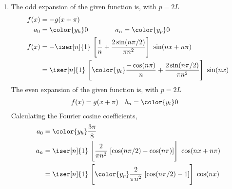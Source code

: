 \begin{enumerate}
    \item The odd expansion of the given function is, with $  p = 2L $
          \begin{align}
              f(x) & = -g(x + \pi)                                                     \\
              a_0  & = {\color{y_h} 0} \qquad\qquad
              a_n = {\color{y_p} 0}                                                    \\
              f(x) & = -\iser[n]{1}\ \Bigg[\frac{1}{n} + \frac{2\sin(n\pi/2)}{\pi n^2}
              \Bigg] \ \sin(nx + n\pi)                                                 \\
                   & = \iser[n]{1}\ \Bigg[ {\color{y_t} \frac{-\cos(n\pi)}{n}
                          + \frac{2\sin(n\pi/2)}{\pi n^2} }\Bigg]\ \sin(nx)
          \end{align}
          The even expansion of the given function is, with $  p = 2L $
          \begin{align}
              f(x) & = g(x + \pi)    &
              b_n  & = \color{y_t} 0
          \end{align}
          Calculating the Fourier cosine coefficients,
          \begin{align}
              a_0 & = \color{y_h} \frac{3\pi}{8}                           \\
              a_n & = \iser[n]{1}\ \Bigg[ \frac{2}{\pi n^2}\ [\cos(n\pi/2)
              - \cos(n\pi)]\Bigg]\ \cos(nx + n\pi)                         \\
                  & = \iser[n]{1}\ \Bigg[ {\color{y_p} \frac{2}{\pi n^2}
              \ [\cos(n\pi/2) - 1]}\Bigg]\ \cos(nx)                        \\
          \end{align}


\end{enumerate}